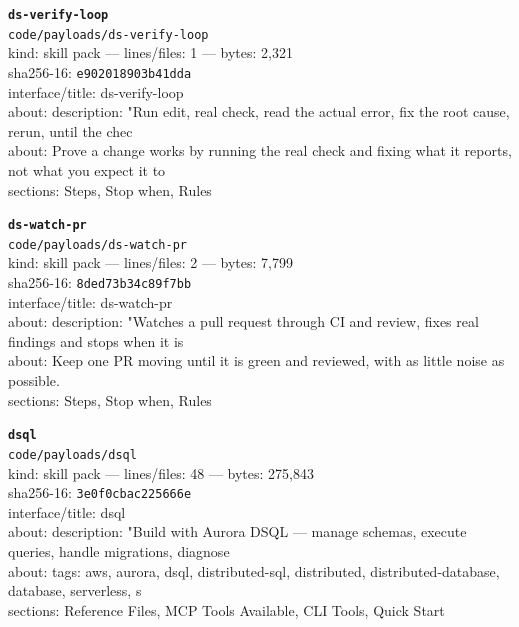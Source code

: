 \noindent\textbf{\texttt{ds-verify-loop}}\\
\texttt{code/payloads/ds-verify-loop}\\
kind: skill pack --- lines/files: 1 --- bytes: 2,321\\
sha256-16: \texttt{e902018903b41dda}\\
interface/title: ds-verify-loop\\
about: description: "Run edit, real check, read the actual error, fix the root cause, rerun, until the chec\\
about: Prove a change works by running the real check and fixing what it reports, not what you expect it to\\
sections: Steps, Stop when, Rules\\
\vspace*{6.0pt}

\noindent\textbf{\texttt{ds-watch-pr}}\\
\texttt{code/payloads/ds-watch-pr}\\
kind: skill pack --- lines/files: 2 --- bytes: 7,799\\
sha256-16: \texttt{8ded73b34c89f7bb}\\
interface/title: ds-watch-pr\\
about: description: "Watches a pull request through CI and review, fixes real findings and stops when it is\\
about: Keep one PR moving until it is green and reviewed, with as little noise as possible.\\
sections: Steps, Stop when, Rules\\
\vspace*{6.0pt}

\noindent\textbf{\texttt{dsql}}\\
\texttt{code/payloads/dsql}\\
kind: skill pack --- lines/files: 48 --- bytes: 275,843\\
sha256-16: \texttt{3e0f0cbac225666e}\\
interface/title: dsql\\
about: description: "Build with Aurora DSQL — manage schemas, execute queries, handle migrations, diagnose \\
about: tags: aws, aurora, dsql, distributed-sql, distributed, distributed-database, database, serverless, s\\
sections: Reference Files, MCP Tools Available, CLI Tools, Quick Start\\
\vspace*{6.0pt}
\newpage

